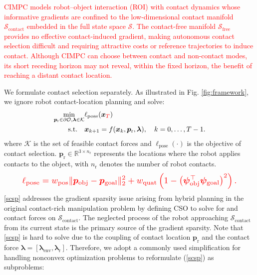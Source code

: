 \textcolor{red}{CIMPC models robot--object interaction (ROI) with contact dynamics whose informative gradients are confined to the low-dimensional contact manifold $\mathcal{S}_{\text{contact}}$ embedded in the full state space $\mathcal{S}$. The contact-free manifold $\mathcal{S}_{\text{free}}$ provides no effective contact-induced gradient, making autonomous contact selection difficult and requiring attractive costs or reference trajectories to induce contact. Although CIMPC can choose between contact and non-contact modes, its short receding horizon may not reveal, within the fixed horizon, the benefit of reaching a distant contact location.}

We formulate contact selection separately. As illustrated in Fig. \ref{fig:framework}, we ignore robot contact-location planning and solve:
\begin{equation}
 \begin{aligned}
 \min_{\boldsymbol{p}_{\text{r}} \in \partial \mathcal{O}, \boldsymbol{\lambda} \in \mathcal{K}} &
 \ell_{\text{pose}}(\boldsymbol{x}_{\textcolor{red}{T}}) \\
 \text{s.t.} \quad
 & \boldsymbol{x}_{k+1} = f(\boldsymbol{x}_k, \boldsymbol{p}_{\text{r}}, \boldsymbol{\lambda}),
 \quad k = 0, \dots, T-1.
 \end{aligned}\label{scsp}
\end{equation}
\noindent where $\mathcal{K}$ is the set of feasible contact forces and $\ell_{\text{pose}}(\cdot)$ is the objective of contact selection. $\boldsymbol{p}_{\text{r}} \in \mathbb{R}^{3 \times n_{\text{r}}}$ represents the locations where the robot applies contacts to the object, with $n_{\text{r}}$ denotes the number of robot contacts.
\begin{equation}\label{equ:obj_pose_cost}
\color{red}
\resizebox{0.89\columnwidth}{!}{$\displaystyle
\ell_{\mathrm{pose}}=w_{\mathrm{pos}}\|\boldsymbol{p}_{\mathrm{obj}}-\boldsymbol{p}_{\mathrm{goal}}\|_2^2
+w_{\mathrm{quat}}\left(1-\left(\boldsymbol{\psi}_{\mathrm{obj}}^\top\boldsymbol{\psi}_{\mathrm{goal}}\right)^2\right).$}
\end{equation}
\noindent \eqref{scsp} addresses the gradient sparsity issue arising from hybrid planning in the original contact-rich manipulation problem by defining CSO to solve for  and contact forces on $\mathcal{S}_{\text{contact}}$. The neglected process of the robot approaching $\mathcal{S}_{\text{contact}}$ from its current state is the primary source of the gradient sparsity. Note that \eqref{scsp} is hard to solve due to the coupling of contact location $\boldsymbol{p}_{\text{r}}$ and the contact force $\boldsymbol{\lambda}=\left [ \boldsymbol{\lambda}_{\text{env}}, \boldsymbol{\lambda}_{\text{r}} \right ]$. Therefore, we adopt a commonly used simplification for handling nonconvex optimization problems to reformulate (\ref{scsp}) as subproblems:
